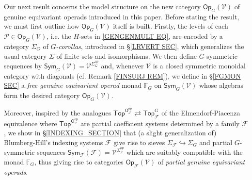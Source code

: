 \documentclass[a4paper,10pt
,draft
]{article}%
\numberwithin{equation}{section}
\numberwithin{figure}{section}
\theoremstyle{definition} %
\newcommand{\Sym}{\ensuremath{\mathsf{Sym}}}%
\newcommand{\V}{\ensuremath{\mathcal V}}
\newcommand{\1}{\ensuremath{\mathbbm 1}}%
\begin{document}
Our next result concerns the model structure
on the new category 
$\mathsf{Op}_G (\mathcal{V})$ of genuine equivariant operads
introduced in this paper. Before stating the result, we must first outline how 
$\mathsf{Op}_G (\mathcal{V})$
itself is built.
Firstly, the levels of each 
$\mathcal{P} \in \mathsf{Op}_G(\mathcal{V})$,
i.e. the $H$-sets in \eqref{GENGENMULT EQ},
are encoded by a category $\Sigma_G$ of 
\textit{$G$-corollas}, introduced in \S \ref{LRVERT SEC},
which generalizes the usual category 
$\Sigma$ of finite sets and isomorphisms.
We then define $G$-symmetric sequences by
$\mathsf{Sym}_G(\mathcal{V})=
\mathcal{V}^{\Sigma_G^{op}}$
\index{categories!SymG@$\Sym_G(\mathcal V) = \V^{\Sigma_G^{op}}$}
and,
whenever $\mathcal{V}$ is a closed symmetric monoidal category with diagonals 
(cf. Remark \ref{FINSURJ REM}),
we define in \S \ref{FGMON SEC}
a \textit{free genuine equivariant operad} monad 
$\mathbb{F}_G$ on
$\mathsf{Sym}_G(\mathcal{V})$
whose algebras form the desired category 
$\mathsf{Op}_G(\mathcal{V})$.

Moreover, inspired by the analogues
$\mathsf{Top}^{\mathsf{O}_{\mathcal{F}}^{op}}
	\rightleftarrows 
\mathsf{Top}^G_{\mathcal{F}}$
of the Elmendorf-Piacenza equivalence
where 
$\mathsf{Top}^{\mathsf{O}_{\mathcal{F}}^{op}}$
are partial coefficient systems determined by a family $\mathcal{F}$, 
we show in \S \ref{INDEXING_SECTION}
that (a slight generalization of)
Blumberg-Hill's indexing systems $\mathcal{F}$
give rise to sieves 
$\Sigma_{\mathcal{F}} \hookrightarrow \Sigma_G$
and partial $G$-symmetric sequences
$\mathsf{Sym_{\mathcal{F}}}(\mathcal{F})
=
\mathcal{V}^{\Sigma_{\mathcal{F}}^{op}}$ which are suitably compatible with the monad
$\mathbb{F}_G$,
thus giving rise to categories
$\mathsf{Op}_{\mathcal{F}}(\mathcal{V})$
of \textit{partial genuine equivariant operads}.
\end{document}
